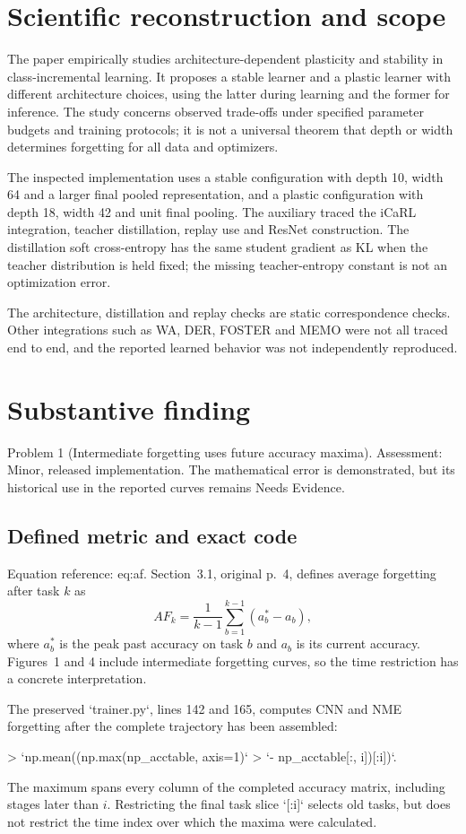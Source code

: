 \documentclass[10pt]{article}
\begin{document}
\section*{Scientific reconstruction and scope}
The paper empirically studies architecture-dependent plasticity and stability in class-incremental learning. It proposes a stable learner and a plastic learner with different architecture choices, using the latter during learning and the former for inference. The study concerns observed trade-offs under specified parameter budgets and training protocols; it is not a universal theorem that depth or width determines forgetting for all data and optimizers.\par
The inspected implementation uses a stable configuration with depth 10, width 64 and a larger final pooled representation, and a plastic configuration with depth 18, width 42 and unit final pooling. The auxiliary traced the iCaRL integration, teacher distillation, replay use and ResNet construction. The distillation soft cross-entropy has the same student gradient as KL when the teacher distribution is held fixed; the missing teacher-entropy constant is not an optimization error.\par
The architecture, distillation and replay checks are static correspondence checks. Other integrations such as WA, DER, FOSTER and MEMO were not all traced end to end, and the reported learned behavior was not independently reproduced.\par
\section*{Substantive finding}
Problem 1 (Intermediate forgetting uses future accuracy maxima).  Assessment: Minor, released implementation. The mathematical error is demonstrated, but its historical use in the reported curves remains Needs Evidence.\par
\subsection*{Defined metric and exact code}
Equation reference: eq:af. Section 3.1, original p. 4, defines average forgetting after task \(k\) as \[
 AF_k=\frac1{k-1}\sum_{b=1}^{k-1}(a_b^\ast-a_b),\] where \(a_b^\ast\) is the peak past accuracy on task \(b\) and \(a_b\) is its current accuracy. Figures 1 and 4 include intermediate forgetting curves, so the time restriction has a concrete interpretation.\par
The preserved `trainer.py`, lines 142 and 165, computes CNN and NME forgetting after the complete trajectory has been assembled:\par
> `np.mean((np.max(np\_acctable, axis=1)`
> `- np\_acctable[:, i])[:i])`.\par
The maximum spans every column of the completed accuracy matrix, including stages later than \(i\). Restricting the final task slice `[:i]` selects old tasks, but does not restrict the time index over which the maxima were calculated.\par
\end{document}

